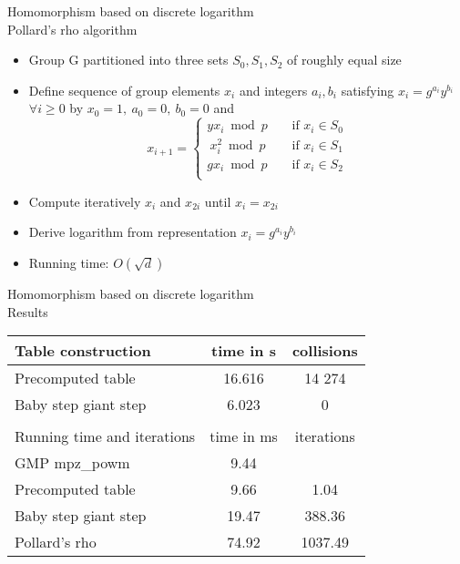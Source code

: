 \documentclass[a4, landscape, slidesonly]{seminar}
\renewcommand{\emph}[1]{{\color{emphcolor} #1}}
\newcommand{\slidetitle}[1]{{\large \color{titlecolor} #1}}
\begin{document}
\begin{slide}
\slidetitle{Homomorphism based on discrete logarithm}
\\[0.5cm]
\emph{Pollard's rho algorithm}\begin{itemize}
\item Group G partitioned into three sets $S_0, S_1, S_2$ of roughly  equal size
\item Define sequence of group elements $x_i$ and integers $a_i, b_i$  satisfying \emph{$x_i = g^{a_i}y^{b_i}$} $\forall i \ge 0$ by $x_0 = 1, ~a_0 = 0, ~b_0 = 0$ and  \[x_{i+1} = \left\{\begin{array}{lr} 
         y x_i \bmod p & ~~~~~\textrm{if } x_i \in S_0\\ 
         ~x_i^2 \bmod p & ~~~~~\textrm{if } x_i \in S_1\\ 
         g x_i \bmod p & ~~~~~\textrm{if } x_i \in S_2\\ 
     \end{array} \right. \] 
\item Compute iteratively $x_i$ and $x_{2i}$ until $x_i = x_{2i}$
\item Derive logarithm from representation $x_i = g^{a_i}y^{b_i}$
\item Running time: $O(\sqrt d)$    
\end{itemize}  
\end{slide}
\begin{slide}
\slidetitle{Homomorphism based on discrete logarithm}
\\[0.5cm]
\emph{Results}
 \begin{table}[htb] 
 \begin{tabular}{|l c c|} 
 \hline 
Table construction  &  {time in s} &  {collisions}\\ 
 \hline  
 Precomputed table & 16.616 & 14 274\\
 Baby step giant step & 6.023 & 0 \\
 \hline 
 & &  \\
Running time and iterations  &  {time in ms} &  {iterations}\\ 
 \hline   
 GMP \ttfamily mpz\_powm \sffamily & 9.44 & ~~~~~~\\
 \hline
 Precomputed table & 9.66 & 1.04\\
 Baby step giant step & 19.47 & 388.36 \\
 Pollard's rho & 74.92 & 1037.49 \\
 \hline 
 \end{tabular}
 \end{table}
\end{slide}
\end{document}
